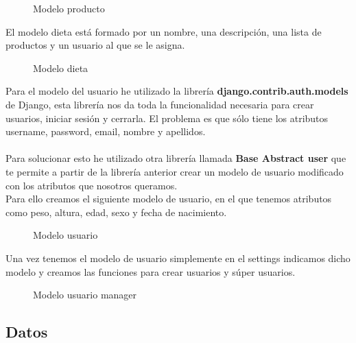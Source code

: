 \begin{figure}[H]
  \centering
  \noindent{}
  \caption{Modelo producto}
\end{figure}

El modelo dieta está formado por un nombre, una descripción, una lista de productos y un usuario al que se le asigna.\\

\begin{figure}[H]
  \centering
  \noindent{}
  \caption{Modelo dieta}
\end{figure}

Para el modelo del usuario he utilizado la librería \textbf{django.contrib.auth.models} de Django, 
esta librería nos da toda la funcionalidad necesaria para crear usuarios, iniciar sesión y cerrarla. 
El problema es que sólo tiene los atributos username, password, email, nombre y apellidos.\\\\

Para solucionar esto he utilizado otra librería llamada \textbf{Base Abstract user} que te permite a partir 
de la librería anterior crear un modelo de usuario modificado con los atributos que nosotros queramos.\\

Para ello creamos el siguiente modelo de usuario, en el que tenemos atributos como peso, altura, edad, sexo y fecha de nacimiento.

\begin{figure}[H]
  \centering
  \noindent{}
  \caption{Modelo usuario}
\end{figure}

Una vez tenemos el modelo de usuario simplemente en el settings indicamos dicho modelo y creamos las funciones 
para crear usuarios y súper usuarios.\\

\begin{figure}[H]
  \centering
  \noindent{}
  \caption{Modelo usuario manager}
\end{figure}

\subsection{Datos}

